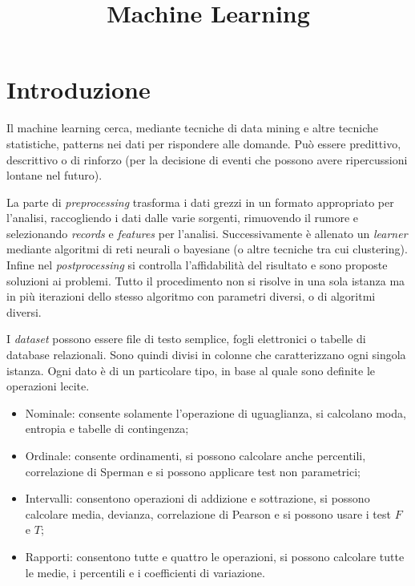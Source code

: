 \documentclass[11pt, a4page, twocolumn]{article}
\title{\textbf{Machine Learning}}
\date{}
\begin{document}
\maketitle



\part{Introduzione}
Il machine learning cerca, mediante tecniche di data mining e altre tecniche statistiche, patterns nei dati per rispondere alle domande.
Può essere predittivo, descrittivo o di rinforzo (per la decisione di eventi che possono avere ripercussioni lontane nel futuro).

La parte di \textit{preprocessing} trasforma i dati grezzi in un formato appropriato per l'analisi, raccogliendo i dati dalle varie sorgenti, rimuovendo il rumore e selezionando \textit{records} e \textit{features} per l'analisi.
Successivamente è allenato un \textit{learner} mediante algoritmi di reti neurali o bayesiane (o altre tecniche tra cui clustering).
Infine nel \textit{postprocessing} si controlla l'affidabilità del risultato e sono proposte soluzioni ai problemi.
Tutto il procedimento non si risolve in una sola istanza ma in più iterazioni dello stesso algoritmo con parametri diversi, o di algoritmi diversi.

I \textit{dataset} possono essere file di testo semplice, fogli elettronici o tabelle di database relazionali.
Sono quindi divisi in colonne che caratterizzano ogni singola istanza.
Ogni dato è di un particolare tipo, in base al quale sono definite le operazioni lecite.
\begin{itemize}
  \item Nominale: consente solamente l'operazione di uguaglianza, si calcolano moda, entropia e tabelle di contingenza;
  \item Ordinale: consente ordinamenti, si possono calcolare anche percentili, correlazione di Sperman e si possono applicare test non parametrici;
  \item Intervalli: consentono operazioni di addizione e sottrazione, si possono calcolare media, devianza, correlazione di Pearson e si possono usare i test $F$ e $T$;
  \item Rapporti: consentono tutte e quattro le operazioni, si possono calcolare tutte le medie, i percentili e i coefficienti di variazione.
\end{itemize}
\end{document}
